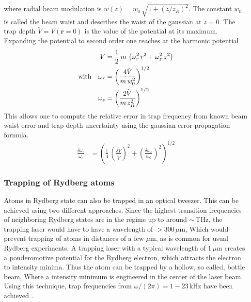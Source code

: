 where radial beam modulation is $w(z)=w_0\,\sqrt{1+(z/z_R)^2}$. The constant $w_0$ is called the beam waist and describes the waist of the gaussian at $z=0$. The trap depth $\tilde{V}=V(\mathbf{r}=0)$ is the value of the potential at its maximum. Expanding the potential to second order one reaches at the harmonic potential
\begin{align*}
    V &= \frac{1}{2}\,m\,\left(\omega_r^2\,r^2+\omega_z^2\,z^2\right)\\
    \text{with}\quad \omega_r&=\left( \frac{4\tilde{V}}{m\,w_0^2} \right)^{1/2}\\
    \omega_z&=\left( \frac{2\tilde{V}}{m\,z_R^2} \right)^{1/2}
\end{align*}
This allows one to compute the relative error in trap frequency from known beam waist error and trap depth uncertainty using the gaussian error propagation formula.
\begin{align*}
    \frac{\delta\omega_r}{\omega_r}&=\left( \frac14\,\left(\frac{\delta\tilde{V}}{\tilde{V}}\right)^2+\left(\frac{\delta w_0}{w_0}\right)^2 \right)^{1/2}
\end{align*}
\subsubsection{Trapping of Rydberg atoms}
Atoms in Rydberg state can also be trapped in an optical tweezer. This can be achieved using two different approaches. Since the highest transition frequencies of neighboring Rydberg states are in the regime up to around $\sim\,$THz, the trapping laser would have to have a wavelength of $>300\,\mu$m, Which would prevent trapping of atoms in distances of a few $\mu$m, as is common for usual Rydberg experiments. A trapping laser with a typical wavelength of $1\,\mu$m creates a ponderomotive potential for the Rydberg electron, which attracts the electron to intensity minima. Thus the atom can be trapped by a hollow, so called, bottle beam, Where a intensity minimum is engineered in the center of the laser beam. Using this technique, trap frequencies from $\omega/(2\pi)=1-23\,$kHz have been achieved \cite{cortinasLaserTrappingCircular2020,mehaignerieInteractingCircularRydberg2025,ArrayIndividualCircular}.

